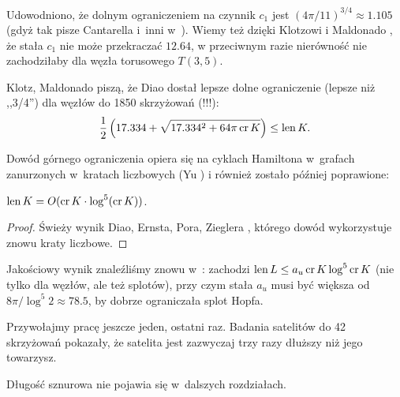 Udowodniono, że dolnym ograniczeniem na czynnik $c_1$ jest $(4\pi/11)^{3/4} \approx 1.105$ (gdyż tak pisze Cantarella i~inni w~\cite[tw. 23]{cantarella02}).
Wiemy też dzięki Klotzowi i Maldonado \cite{klotz21}, że stała $c_1$ nie może przekraczać $12.64$, w przeciwnym razie nierówność nie zachodziłaby dla węzła torusowego $T(3, 5)$.
%
%

Klotz, Maldonado \cite{klotz21} piszą, że Diao dostał lepsze dolne ograniczenie (lepsze niż ,,3/4'') dla węzłów do 1850 skrzyżowań (!!!):
\begin{equation}
    \frac 12 \left(17.334 + \sqrt{17.334^2 + 64 \pi \operatorname{cr} K}\right) \le \operatorname{len} K.
\end{equation}

Dowód górnego ograniczenia opiera się na cyklach Hamiltona w~grafach zanurzonych w~kratach liczbowych (Yu \cite{yu04}) i również zostało później poprawione:


\begin{proposition}
    $\operatorname{len} K = O(\operatorname{cr} K \cdot \log^5(\operatorname{cr} K))$.
\end{proposition}

\begin{proof}
    Świeży wynik Diao, Ernsta, Pora, Zieglera \cite{diao19}, którego dowód wykorzystuje znowu kraty liczbowe.
\end{proof}

Jakościowy wynik znaleźliśmy znowu w~\cite{klotz21}: zachodzi $\operatorname{len} L \le a_u \operatorname{cr} K \log^5 \operatorname{cr} K$ (nie tylko dla węzłów, ale też splotów), przy czym stała $a_u$ musi być większa od $8\pi/\log^5 2 \approx 78.5$, by dobrze ograniczała splot Hopfa.

Przywołajmy pracę \cite{klotz21} jeszcze jeden, ostatni raz.
Badania satelitów do 42 skrzyżowań pokazały, że satelita jest zazwyczaj trzy razy dłuższy niż jego towarzysz.

Długość sznurowa nie pojawia się w~dalszych rozdziałach.

%


